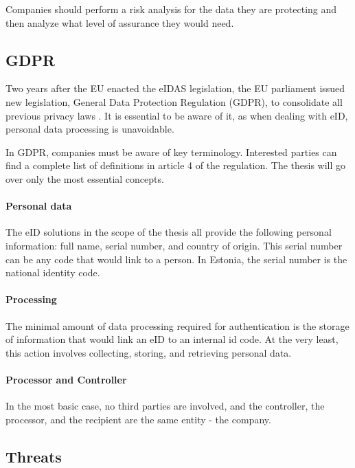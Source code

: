Companies should perform a risk analysis for the data they are protecting and then analyze what level of assurance they would need.

\subsection{GDPR}

Two years after the EU enacted the eIDAS legislation, the EU parliament issued new legislation, General Data Protection Regulation (GDPR), to consolidate all previous privacy laws \cite{eulaw-gdpr}. It is essential to be aware of it, as when dealing with eID, personal data processing is unavoidable. 

In GDPR, companies must be aware of key terminology. Interested parties can find a complete list of definitions in article 4 of the regulation. The thesis will go over only the most essential concepts.

\paragraph{Personal data} The eID solutions in the scope of the thesis all provide the following personal information: full name, serial number, and country of origin. This serial number can be any code that would link to a person. In Estonia, the serial number is the national identity code.

\paragraph{Processing} The minimal amount of data processing required for authentication is the storage of information that would link an eID to an internal id code. At the very least, this action involves collecting, storing, and retrieving personal data.

\paragraph{Processor and Controller} In the most basic case, no third parties are involved, and the controller, the processor, and the recipient are the same entity - the company.

\subsection{Threats}

